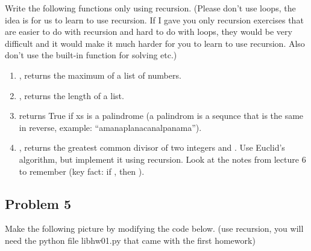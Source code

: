 \documentclass[letterpaper,11pt]{amsart}
\theoremstyle{plain}
\theoremstyle{definition}
\begin{document}
Write the following functions only using recursion. (Please don't use loops, the idea is for us to learn to use recursion. If I gave you only recursion exercises that are easier to do with recursion and hard to do with loops, they would be very difficult and it would make it much harder for you to learn to use recursion. Also don't use the built-in function  for solving  etc.)


\begin{enumerate}
  \item {}, returns the maximum of a list of numbers. 
  \item {}, returns the length of a list. 
  \item {} returns True if xs is a palindrome (a palindrom is a sequnce that is the same in reverse, example: ``amanaplanacanalpanama''). 
  \item {}, returns the greatest common divisor of two integers  and . Use Euclid's algorithm, but implement it using recursion. Look at the notes from lecture 6 to remember (key fact: if , then ).
  
\end{enumerate}

\subsection*{Problem 5} Make the following picture by modifying the code below. (use recursion, you will need the python file libhw01.py that came with the first homework) 
\end{document}
